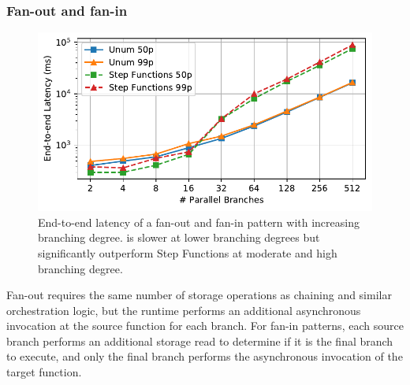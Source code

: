 \subsubsection{Fan-out and fan-in}\label{sec:eval:fan-out}


\begin{figure}[t]
  \centering
  \includegraphics[width=\columnwidth]{figures/MapMicroLatency.pdf}
  \caption{End-to-end latency of a fan-out and fan-in pattern with increasing
branching degree. \name{} is slower at lower branching degrees but significantly
outperform Step Functions at moderate and high branching degree.}
  \label{fig:mapmicrolatency}
\end{figure}

Fan-out requires the same number of storage operations as chaining and similar
orchestration logic, but the \name{} runtime performs an additional asynchronous
invocation at the source function for each branch. For fan-in patterns, each
source branch performs an additional storage read to determine if it is the
final branch to execute, and only the final branch performs the asynchronous
invocation of the target function.


